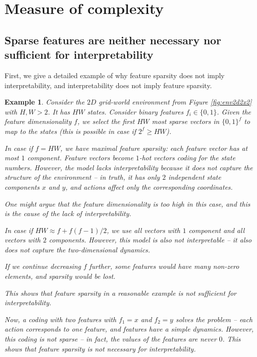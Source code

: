 \documentclass[a4paper,11pt,oneside]{report}
\newtheorem{example}{Example}[section]
\begin{document}
\section{Measure of complexity}

\subsection{Sparse features are neither necessary nor sufficient for interpretability}
First, we give a detailed example of why feature sparsity does not imply interpretability, and interpretability does not imply feature sparsity.

\begin{example}
    Consider the $2D$ grid-world environment from Figure \ref{fig:env2d2x2} with $H,W>2$. It has $HW$ states. Consider binary features $f_i\in\{0,1\}$. Given the feature dimensionality $f$, we select the first $HW$ most sparse vectors in $\{0,1\}^f$ to map to the states (this is possible in case if $2^f\geq HW$).

    In case if $f=HW$, we have maximal feature sparsity: each feature vector has at most $1$ component. Feature vectors become $1$-hot vectors coding for the state numbers. However, the model lacks interpretability because it does not capture the structure of the environment -- in truth, it has only $2$ independent state components $x$ and $y$, and actions affect only the corresponding coordinates.

    One might argue that the feature dimensionality is too high in this case, and this is the cause of the lack of interpretability.

    In case if $HW\approx f+f(f-1)/2$, we use all vectors with $1$ component and all vectors with $2$ components. However, this model is also not interpretable -- it also does not capture the two-dimensional dynamics.

    If we continue decreasing $f$ further, some features would have many non-zero elements, and sparsity would be lost.

    This shows that feature sparsity in a reasonable example is not sufficient for interpretability.

    Now, a coding with two features with $f_1=x$ and $f_2=y$ solves the problem -- each action corresponds to one feature, and features have a simple dynamics.
    However, this coding is not sparse -- in fact, the values of the features are never $0$. This shows that feature sparsity is not necessary for interpretability.
\end{example}
\end{document}
